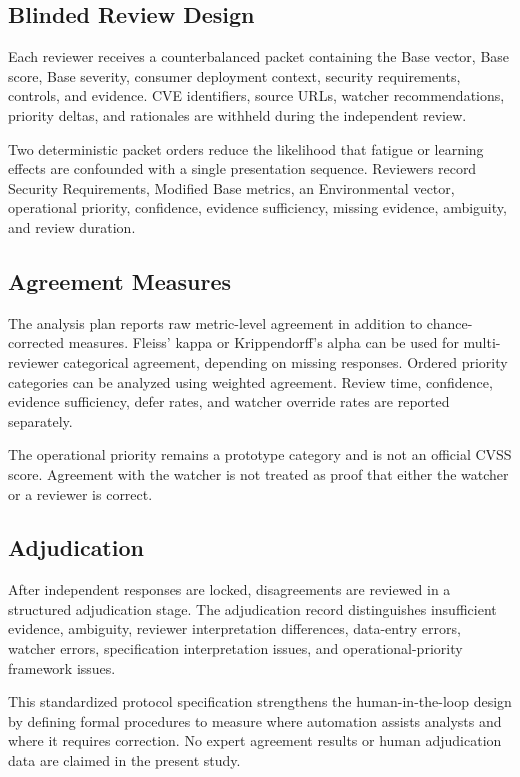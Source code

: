 \documentclass[conference]{IEEEtran}
\begin{document}
\subsection{Blinded Review Design}

Each reviewer receives a counterbalanced packet containing the Base vector,
Base score, Base severity, consumer deployment context, security requirements,
controls, and evidence. CVE identifiers, source URLs, watcher recommendations,
priority deltas, and rationales are withheld during the independent review.

Two deterministic packet orders reduce the likelihood that fatigue or learning
effects are confounded with a single presentation sequence. Reviewers record
Security Requirements, Modified Base metrics, an Environmental vector,
operational priority, confidence, evidence sufficiency, missing evidence,
ambiguity, and review duration.

\subsection{Agreement Measures}

The analysis plan reports raw metric-level agreement in addition to
chance-corrected measures. Fleiss' kappa or Krippendorff's alpha can be used for
multi-reviewer categorical agreement, depending on missing responses. Ordered
priority categories can be analyzed using weighted agreement. Review time,
confidence, evidence sufficiency, defer rates, and watcher override rates are
reported separately.

The operational priority remains a prototype category and is not an official
CVSS score. Agreement with the watcher is not treated as proof that either the
watcher or a reviewer is correct.

\subsection{Adjudication}

After independent responses are locked, disagreements are reviewed in a
structured adjudication stage. The adjudication record distinguishes
insufficient evidence, ambiguity, reviewer interpretation differences,
data-entry errors, watcher errors, specification interpretation issues, and
operational-priority framework issues.

This standardized protocol specification strengthens the human-in-the-loop design by defining
formal procedures to measure where automation assists analysts and where it requires correction. No expert
agreement results or human adjudication data are claimed in the present study.


\end{document}
